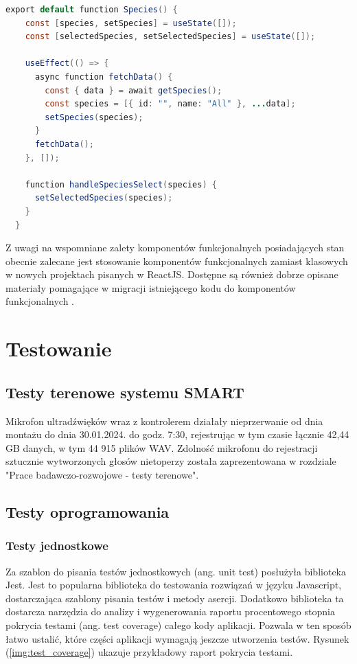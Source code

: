 \documentclass{sprz}
\begin{document}
\begin{lstlisting}[language=Java,caption={Przykład komponentu funkcjonalnego}, label={lst:functional_component}]
  export default function Species() {
    const [species, setSpecies] = useState([]);
    const [selectedSpecies, setSelectedSpecies] = useState([]);
  
    useEffect(() => {
      async function fetchData() {
        const { data } = await getSpecies();
        const species = [{ id: "", name: "All" }, ...data];
        setSpecies(species);
      }
      fetchData();
    }, []);
  
    function handleSpeciesSelect(species) {
      setSelectedSpecies(species);
    }
  }
\end{lstlisting}

Z uwagi na wspomniane zalety komponentów funkcjonalnych posiadających stan obecnie zalecane jest stosowanie komponentów funkcjonalnych zamiast klasowych w nowych projektach pisanych w ReactJS. Dostępne są również dobrze opisane materiały pomagające w migracji istniejącego kodu do komponentów funkcjonalnych \cite{react-component}.

\chapter{Testowanie}

\section{Testy terenowe systemu SMART}
Mikrofon ultradźwięków wraz z kontrolerem działały nieprzerwanie od dnia montażu do dnia 30.01.2024. do godz. 7:30, rejestrując w tym czasie łącznie 42,44 GB danych, w tym 44 915 plików WAV.
Zdolność mikrofonu do rejestracji sztucznie wytworzonych głosów nietoperzy została zaprezentowana w rozdziale "Prace badawczo-rozwojowe - testy terenowe".

\section{Testy oprogramowania}

\subsection{Testy jednostkowe}

Za szablon do pisania testów jednostkowych (ang. unit test) posłużyła biblioteka Jest. Jest to popularna biblioteka do testowania rozwiązań w języku Javascript, dostarczająca szablony pisania testów i metody asercji. Dodatkowo biblioteka ta dostarcza narzędzia do analizy i wygenerowania raportu procentowego stopnia pokrycia testami (ang. test coverage) całego kody aplikacji. Pozwala w ten sposób łatwo ustalić, które części aplikacji wymagają jeszcze utworzenia testów. Rysunek (\ref{img:test_coverage}) ukazuje przykładowy raport pokrycia testami.
\end{document}
